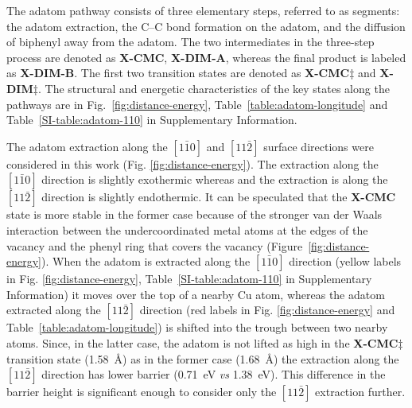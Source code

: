\documentclass[%
 reprint,
 amsmath,amssymb,
 aps,
prb,
floatfix,
]{revtex4-2}
\newcommand{\lock}{\color{red}}
\newcommand{\lock}{\color{red}}
\newcommand{\sinfo}{Supplementary Information}
\begin{document}
{\lock

The adatom pathway consists of three elementary steps, referred to as segments: the adatom extraction, the C--C bond formation on the adatom, and the diffusion of biphenyl away from the adatom. The two intermediates in the three-step process are denoted as \textbf{X-CMC}, \textbf{X-DIM-A}, whereas the final product is labeled as \textbf{X-DIM-B}. The first two transition states are denoted as \textbf{X-CMC$\ddagger$} and \textbf{X-DIM$\ddagger$}. The structural and energetic characteristics of the key states along the pathways are in Fig.~\ref{fig:distance-energy}, Table~\ref{table:adatom-longitude} and Table~\ref{SI-table:adatom-110} in \sinfo.

The adatom extraction along the $[1\bar{1}0]$ and $[11\bar{2}]$ surface directions were considered in this work (Fig. \ref{fig:distance-energy}). 
%
The extraction along the $[1\bar{1}0]$ direction is slightly exothermic whereas and the extraction is along the $[11\bar{2}]$ direction is slightly endothermic. It can be speculated that the \textbf{X-CMC} state is more stable in the former case because of the stronger van der Waals interaction between the undercoordinated metal atoms at the edges of the vacancy and the phenyl ring that covers the vacancy (Figure~\ref{fig:distance-energy}).
%
When the adatom is extracted along the $[1\bar{1}0]$ direction (yellow labels in Fig. \ref{fig:distance-energy}, Table~\ref{SI-table:adatom-110} in \sinfo) it moves over the top of a nearby Cu atom, whereas the adatom extracted along the $[11\bar{2}]$ direction (red labels in Fig. \ref{fig:distance-energy} and Table~\ref{table:adatom-longitude}) is shifted into the trough between two nearby atoms. Since, in the latter case, the adatom is not lifted as high in the \textbf{X-CMC$\ddagger$} transition state (\SI{1.58}{\angstrom}) as in the former case (\SI{1.68}{\angstrom}) the extraction along the $[11\bar{2}]$ direction has lower barrier (\SI{0.71}{\electronvolt} \emph{vs} \SI{1.38}{\electronvolt}). This difference in the barrier height is significant enough to consider only the $[11\bar{2}]$ extraction further.

}
\end{document}
